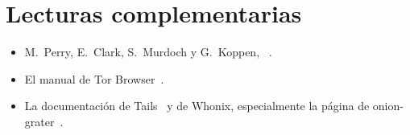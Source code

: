 \section*{Lecturas complementarias}
\begin{itemize}
  \item M.~Perry, E.~Clark, S.~Murdoch y G.~Koppen, ~\cite{perry2018torbrowser}.
  \item El manual de Tor Browser~\cite{tbmanual}.
  \item La documentación de Tails~\cite{tailsabout} y de Whonix, especialmente la página de onion-grater~\cite{whonixgrater}.
\end{itemize}
